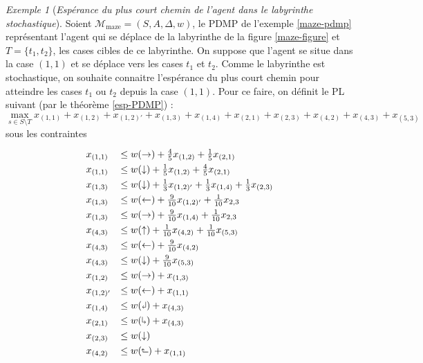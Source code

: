 \documentclass[12pt,a4paper]{report}
\theoremstyle{definition}%
\theoremstyle{remark}
\newtheorem{example}{Exemple}[chapter]
\begin{document}
\begin{example}[\textit{Espérance du plus court chemin de l'agent dans le
	labyrinthe stochastique}]
	Soient $\mathcal{M}_{\text{maze}} = (S, A, \Delta, w)$, le PDMP de l'exemple
	\ref{maze-pdmp} représentant l'agent qui se déplace de la labyrinthe de la
	figure \ref{maze-figure} et $T = \{ t_1, t_2 \}$, les cases cibles
	de ce labyrinthe. On suppose que l'agent se situe dans la case $(1, 1)$
	et se déplace vers les cases $t_1$ et $t_2$. Comme le labyrinthe est
	stochastique, on souhaite connaitre l'espérance du plus court chemin pour
	atteindre les cases $t_1$ ou $t_2$ depuis la case $(1, 1)$. Pour ce faire, on
	définit le PL suivant (par le théorème \ref{esp-PDMP}) :
\[
	\max_{s \in S \setminus T}
		x_{(1, 1)} + x_{(1, 2)} + x_{(1, 2)'} + x_{(1, 3)} + x_{(1, 4)}
		+ x_{(2, 1)} + x_{(2, 3)} + x_{(4, 2)} + x_{(4, 3)} + x_{(5, 3)}
\]
sous les contraintes
\footnotesize
	\[
  \renewcommand{\arraystretch}{1.3}
  \begin{array}{ll}
		x_{(1, 1)} &\leq w(\rightarrow) + \frac{4}{5} x_{(1, 2)} + \frac{1}{5}
			x_{(2, 1)} \\
		x_{(1, 1)} &\leq w(\downarrow) + \frac{1}{5} x_{(1, 2)} + \frac{4}{5}
			x_{(2, 1)} \\
		x_{(1, 3)} &\leq w(\downarrow) + \frac{1}{3} x_{(1, 2)'} + \frac{1}{3}
		x_{(1, 4)} + \frac{1}{3} x_{(2, 3)} \\
		x_{(1, 3)} &\leq w(\leftarrow) + \frac{9}{10} x_{(1, 2)'} +
			\frac{1}{10} x_{2, 3}\\
		x_{(1, 3)} &\leq w(\rightarrow) + \frac{9}{10} x_{(1, 4)} +
			\frac{1}{10} x_{2, 3}\\
		x_{(4, 3)} &\leq w(\uparrow) + \frac{1}{10} x_{(4, 2)} + \frac{1}{10}
			x_{(5, 3)} \\
		x_{(4, 3)} &\leq w(\leftarrow) + \frac{9}{10} x_{(4, 2)} \\
		x_{(4, 3)} &\leq w(\downarrow) + \frac{9}{10} x_{(5, 3)} \\
		x_{(1, 2)} &\leq w(\rightarrow) + x_{(1, 3)} \\
		x_{(1, 2)'} &\leq w(\leftarrow) + x_{(1, 1)} \\
		x_{(1, 4)} &\leq w(\text{\rotatebox[origin=c]{180}{$\Rsh$}}) + x_{(4, 3)} \\
		x_{(2, 1)} &\leq w(\text{\rotatebox[origin=c]{180}{$\Lsh$}})
		 	+ x_{(4, 3)} \\
		x_{(2, 3)} &\leq w(\downarrow) \\
		x_{(4, 2)} &\leq w(\text{\rotatebox[origin=c]{90}{$\Rsh$}})
			+ x_{(1, 1)} \\

\end{array}\]
\end{example}
\end{document}
